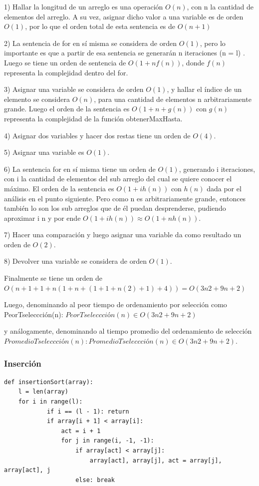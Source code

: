 \documentclass[titlepage,a4paper]{article}
\begin{document}
1) Hallar la longitud de un arreglo es una operación $O(n)$, con n la cantidad de elementos del arreglo. A su vez, asignar dicho valor a una variable es de orden $O(1)$, por lo que el orden total de esta sentencia es de $O(n + 1)$

2) La sentencia de for en sí misma se considera de orden $O(1)$, pero lo importante es que a partir de esa sentencia se generarán n iteraciones (n = l) . Luego se tiene un orden de sentencia de $O(1 + nf(n))$, donde $f(n)$ representa la complejidad dentro del for.

3) Asignar una variable se considera de orden $O(1)$, y hallar el índice de un elemento se considera $O(n)$, para una cantidad de elementos n arbitrariamente grande. Luego el orden de la sentencia es $O(1 + n + g(n))$ con $g(n)$ representa la complejidad de la función obtenerMaxHasta.

4) Asignar dos variables y hacer dos restas tiene un orden de $O(4)$.

5) Asignar una variable es $O(1)$.

6) La sentencia for en sí misma tiene un orden de $O(1)$, generando i iteraciones, con i la cantidad de elementos del sub arreglo del cual se quiere conocer el máximo. El orden de la sentencia es $O(1 + i h(n))$ con $h(n)$ dada por el análisis en el punto siguiente. Pero como n es arbitrariamente grande, entonces también lo son los sub arreglos que de él puedan desprenderse, pudiendo aproximar i n y por ende $O(1 + i h(n))  \approx  O(1 + n h(n))$.

7) Hacer una comparación y luego asignar una variable da como resultado un orden de $O(2)$.

8) Devolver una variable se considera de orden $O(1)$.

Finalmente se tiene un orden de 
$O( n + 1 + 1+ n (1 + n + (1+ 1 + n (2) + 1)  + 4 ) ) =
O( 3n2 + 9n + 2)$
 
Luego, denominando al peor tiempo de ordenamiento por selección como PeorTseleccción(n):
$PeorTseleccción(n) \in O( 3n2 + 9n + 2)$ 

y análogamente, denominando al tiempo promedio del ordenamiento de selección $PromedioTseleccción(n): PromedioTseleccción(n)  \in O( 3n2 + 9n + 2)$. 

\subsubsection{Inserción}
\begin{verbatim}
def insertionSort(array):
	l = len(array)
	for i in range(l):
            if i == (l - 1): return
            if array[i + 1] < array[i]:
                act = i + 1
                for j in range(i, -1, -1):
                    if array[act] < array[j]:
                        array[act], array[j], act = array[j], array[act], j
                    else: break
\end{verbatim}
\end{document}
